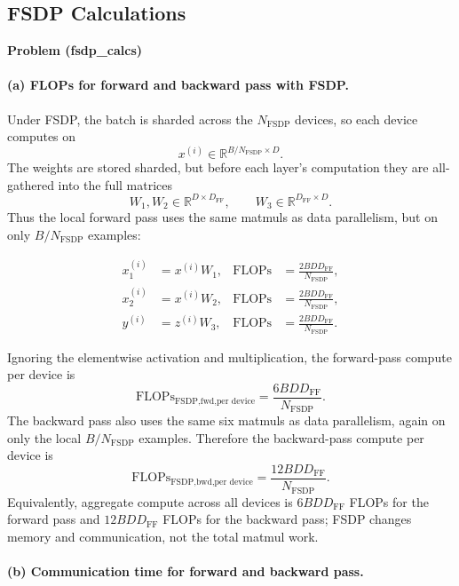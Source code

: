 \documentclass[11pt]{article}
\begin{document}
\subsection{FSDP Calculations}
\textbf{Problem (fsdp\_calcs)}

\paragraph{(a) FLOPs for forward and backward pass with FSDP.}

Under FSDP, the batch is sharded across the $N_{\text{FSDP}}$ devices, so each
device computes on
\[
  x^{(i)} \in \mathbb{R}^{B/N_{\text{FSDP}} \times D}.
\]
The weights are stored sharded, but before each layer's computation they are
all-gathered into the full matrices
\[
  W_1, W_2 \in \mathbb{R}^{D \times D_{\text{FF}}},
  \qquad
  W_3 \in \mathbb{R}^{D_{\text{FF}} \times D}.
\]
Thus the local forward pass uses the same matmuls as data parallelism, but on
only $B/N_{\text{FSDP}}$ examples:

\begin{align*}
  x_1^{(i)} &= x^{(i)} W_1,
  &
  \text{FLOPs} &= \frac{2 B D D_{\text{FF}}}{N_{\text{FSDP}}},
\\
  x_2^{(i)} &= x^{(i)} W_2,
  &
  \text{FLOPs} &= \frac{2 B D D_{\text{FF}}}{N_{\text{FSDP}}},
\\
  y^{(i)} &= z^{(i)} W_3,
  &
  \text{FLOPs} &= \frac{2 B D D_{\text{FF}}}{N_{\text{FSDP}}}.
\end{align*}

Ignoring the elementwise activation and multiplication, the forward-pass compute
per device is
\[
  \boxed{
    \text{FLOPs}_{\text{FSDP,fwd,per device}}
    =
    \frac{6 B D D_{\text{FF}}}{N_{\text{FSDP}}}
  }.
\]
The backward pass also uses the same six matmuls as data parallelism, again on
only the local $B/N_{\text{FSDP}}$ examples. Therefore the backward-pass compute
per device is
\[
  \boxed{
    \text{FLOPs}_{\text{FSDP,bwd,per device}}
    =
    \frac{12 B D D_{\text{FF}}}{N_{\text{FSDP}}}
  }.
\]
Equivalently, aggregate compute across all devices is $6BD D_{\text{FF}}$ FLOPs
for the forward pass and $12BD D_{\text{FF}}$ FLOPs for the backward pass; FSDP
changes memory and communication, not the total matmul work.



\paragraph{(b) Communication time for forward and backward pass.}
\end{document}
